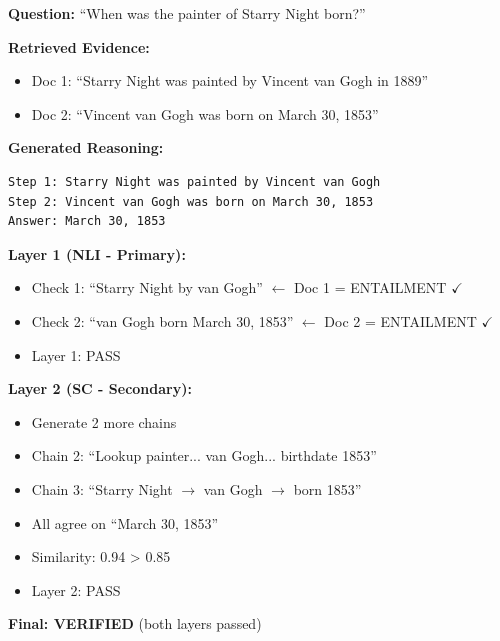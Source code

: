 \documentclass[12pt,a4paper]{article}
\theoremstyle{definition}
\begin{document}
\begin{examplebox}[title=HotpotQA: NLI Primary + SC Secondary]

\textbf{Question:} ``When was the painter of Starry Night born?''

\textbf{Retrieved Evidence:}
\begin{itemize}
    \item Doc 1: ``Starry Night was painted by Vincent van Gogh in 1889''
    \item Doc 2: ``Vincent van Gogh was born on March 30, 1853''
\end{itemize}

\textbf{Generated Reasoning:}
\begin{verbatim}
Step 1: Starry Night was painted by Vincent van Gogh
Step 2: Vincent van Gogh was born on March 30, 1853
Answer: March 30, 1853
\end{verbatim}

\textbf{Layer 1 (NLI - Primary):}
\begin{itemize}
    \item Check 1: ``Starry Night by van Gogh'' $\leftarrow$ Doc 1 = ENTAILMENT $\checkmark$
    \item Check 2: ``van Gogh born March 30, 1853'' $\leftarrow$ Doc 2 = ENTAILMENT $\checkmark$
    \item Layer 1: PASS
\end{itemize}

\textbf{Layer 2 (SC - Secondary):}
\begin{itemize}
    \item Generate 2 more chains
    \item Chain 2: ``Lookup painter... van Gogh... birthdate 1853''
    \item Chain 3: ``Starry Night $\rightarrow$ van Gogh $\rightarrow$ born 1853''
    \item All agree on ``March 30, 1853''
    \item Similarity: 0.94 > 0.85
    \item Layer 2: PASS
\end{itemize}

\textbf{Final: VERIFIED} (both layers passed)
\end{examplebox}
\end{document}
